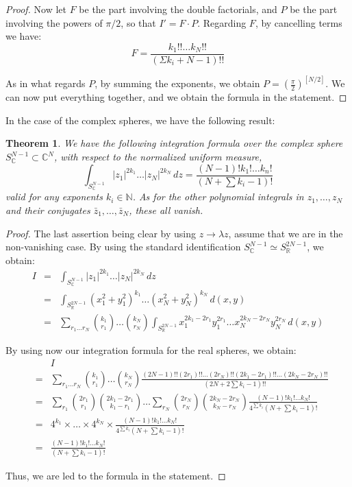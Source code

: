 \documentclass[12pt]{amsbook}
\newtheorem{theorem}{Theorem}[chapter]
\begin{document}
\begin{proof}
Now let $F$ be the part involving the double factorials, and $P$ be the part involving the powers of $\pi/2$, so that $I'=F\cdot P$. Regarding $F$, by cancelling terms we have:
$$F=\frac{k_1!!\ldots k_N!!}{(\Sigma k_i+N-1)!!}$$

As in what regards $P$, by summing the exponents, we obtain $P=\left(\frac{\pi}{2}\right)^{[N/2]}$. We can now put everything together, and we obtain the formula in the statement.
\end{proof}

In the case of the complex spheres, we have the following result:


\begin{theorem}
We have the following integration formula over the complex sphere $S^{N-1}_\mathbb C\subset\mathbb C^N$, with respect to the normalized uniform measure, 
$$\int_{S^{N-1}_\mathbb C}|z_1|^{2k_1}\ldots|z_N|^{2k_N}\,dz=\frac{(N-1)!k_1!\ldots k_n!}{(N+\sum k_i-1)!}$$
valid for any exponents $k_i\in\mathbb N$. As for the other polynomial integrals in $z_1,\ldots,z_N$ and their conjugates $\bar{z}_1,\ldots,\bar{z}_N$, these all vanish.
\end{theorem}

\begin{proof}
The last assertion being clear by using $z\to\lambda z$, assume that we are in the non-vanishing case. By using the standard identification $S^{N-1}_\mathbb C\simeq S^{2N-1}_\mathbb R$, we obtain:
\begin{eqnarray*}
I
&=&\int_{S^{N-1}_\mathbb C}|z_1|^{2k_1}\ldots|z_N|^{2k_N}\,dz\\
&=&\int_{S^{2N-1}_\mathbb R}(x_1^2+y_1^2)^{k_1}\ldots(x_N^2+y_N^2)^{k_N}\,d(x,y)\\
&=&\sum_{r_1\ldots r_N}\binom{k_1}{r_1}\ldots\binom{k_N}{r_N}\int_{S^{2N-1}_\mathbb R}x_1^{2k_1-2r_1}y_1^{2r_1}\ldots x_N^{2k_N-2r_N}y_N^{2r_N}\,d(x,y)
\end{eqnarray*}

By using now our integration formula for the real spheres, we obtain:
\begin{eqnarray*}
&&I\\
&=&\sum_{r_1\ldots r_N}\binom{k_1}{r_1}\ldots\binom{k_N}{r_N}\frac{(2N-1)!!(2r_1)!!\ldots(2r_N)!!(2k_1-2r_1)!!\ldots (2k_N-2r_N)!!}{(2N+2\sum k_i-1)!!}\\
&=&\sum_{r_1}\binom{2r_1}{r_1}\binom{2k_1-2r_1}{k_1-r_1}\ldots\sum_{r_N}\binom{2r_N}{r_N}\binom{2k_N-2r_N}{k_N-r_N}\frac{(N-1)!k_1!\ldots k_N!}{4^{\sum k_i}(N+\sum k_i-1)!}\\
&=&4^{k_1}\times\ldots\times 4^{k_N}\times\frac{(N-1)!k_1!\ldots k_N!}{4^{\sum k_i}(N+\sum k_i-1)!}\\
&=&\frac{(N-1)!k_1!\ldots k_N!}{(N+\sum k_i-1)!}
\end{eqnarray*}

Thus, we are led to the formula in the statement.
\end{proof}
\end{document}
